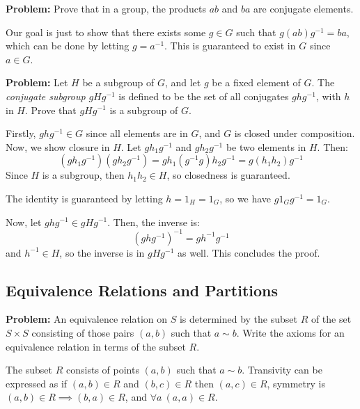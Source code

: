 \documentclass[10pt]{article}
\newenvironment{problem}{\textbf{Problem:}}{}
\begin{document}
\begin{problem}
	Prove that in a group, the products \( ab \) and \( ba \) are conjugate elements. 
\end{problem}

\begin{solution}
	Our goal is just to show that there exists some \( g \in G \) such that 
	\( g(ab) g^{-1} = ba \), which can be done by letting \( g = a^{-1} \). This 
	is guaranteed to exist in \( G \) since \( a \in G \). 
\end{solution}

\begin{problem}
	Let \( H \) be a subgroup of \( G \), and let \( g \) be a fixed element of \( G \).
	The \textit{conjugate subgroup} \( gHg^{-1} \) is defined to be the set of all 
	conjugates \( ghg^{-1} \), with \( h \) in \( H \). Prove that \( gHg^{-1} \) is a 
	subgroup of \( G \). 
\end{problem}

\begin{solution}
	Firstly, \( ghg^{-1} \in G \) since all elements are in \( G \), and \( G \) is 
	closed under composition. Now, we show closure in \( H \). Let 
	\( gh_1g^{-1} \) and \( gh_2g^{-1} \) be two elements in \( H \). Then:
	\[
		(gh_1g^{-1})(gh_2g^{-1}) = gh_1(g^{-1}g)h_2g^{-1} = g(h_1h_2)g^{-1} 
	\] 
	Since \( H \) is a subgroup, then  \( h_1h_2 \in H \), so closedness is guaranteed. 

	The identity is guaranteed by letting \( h = 1_H = 1_G\), so we have 
	\( g 1_G g^{-1} = 1_G\). 

	Now, let \( ghg^{-1} \in gHg^{-1} \). Then, the inverse is:
	\[
		(ghg^{-1})^{-1} = gh^{-1}g^{-1}
	\] 
	and \( h^{-1} \in H \), so the inverse is in \( gHg^{-1} \) as well. This concludes
	the proof. 
\end{solution}

\subsection{Equivalence Relations and Partitions}

\begin{problem}
	An equivalence relation on \( S \) is determined by the subset \( R \) of 
	the set \( S \times S \) consisting of those pairs \( (a, b) \) such that 
	\( a \sim b \). Write the axioms for an equivalence relation in 
	terms of the subset \( R \). 
\end{problem}

\begin{solution}
	The subset \( R \) consists of points \( (a,b) \) such that \( a \sim b \). 
	Transivity can be expressed as if \( (a, b) \in R \) and \( (b, c) \in R \) then 
	\( (a, c) \in R \), symmetry is \( (a, b) \in R \implies (b, a) \in R \), and 
	\( \forall a \ (a, a) \in R \). 
\end{solution}
\end{document}
